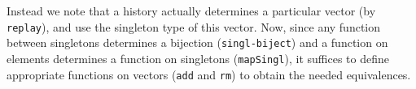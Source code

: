 Instead we note that a history actually determines a particular vector (by \texttt{replay}), and use the singleton
type of this vector. Now, since any function between singletons determines a bijection (\texttt{singl-biject})
and a function on elements determines a function on singletons (\texttt{mapSingl}), it suffices to
define appropriate functions on vectors (\texttt{add} and \texttt{rm}) to obtain the needed equivalences.

\begin{code}%
\>[0]\AgdaSpace{}%
\AgdaSymbol{:}\AgdaSpace{}%
\AgdaSymbol{\{}\AgdaSpace{}%
\AgdaSymbol{:}\AgdaSpace{}%
\AgdaSymbol{\}}\AgdaSpace{}%
\AgdaSpace{}%
\AgdaSpace{}%
\AgdaSpace{}%
\AgdaSpace{}%
\AgdaSpace{}%
\AgdaSpace{}%
\AgdaSpace{}%
\<%
\\
\>[0]\AgdaSpace{}%
\AgdaInductiveConstructor{[]}\AgdaSpace{}%
\AgdaSymbol{=}\AgdaSpace{}%
\AgdaInductiveConstructor{[]}\<%
\\
\>[0]\AgdaSpace{}%
\AgdaSymbol{(}\AgdaSpace{}%
\AgdaSpace{}%
\AgdaSpace{}%
\AgdaSpace{}%
\AgdaOperator{\AgdaInductiveConstructor{::}}\AgdaSpace{}%
\AgdaSymbol{)}\AgdaSpace{}%
\AgdaSymbol{=}\AgdaSpace{}%
\AgdaSpace{}%
\AgdaSpace{}%
\AgdaSpace{}%
\AgdaSymbol{(}\AgdaSpace{}%
\AgdaSymbol{)}\<%
\\
\>[0]\AgdaSpace{}%
\AgdaSymbol{(}\AgdaSpace{}%
\AgdaSpace{}%
\AgdaOperator{\AgdaInductiveConstructor{::}}\AgdaSpace{}%
\AgdaSymbol{)}\AgdaSpace{}%
\AgdaSymbol{=}\AgdaSpace{}%
\AgdaSpace{}%
\AgdaSpace{}%
\AgdaSymbol{(}\AgdaSpace{}%
\AgdaSymbol{)}\<%
\\
%
\\[\AgdaEmptyExtraSkip]%
\>[0]\AgdaSpace{}%
\AgdaSymbol{:}\AgdaSpace{}%
\AgdaSpace{}%
\AgdaSpace{}%
\<%
\\
\>[0]\AgdaSpace{}%
\AgdaSymbol{(}\AgdaSpace{}%
\AgdaSymbol{)}\AgdaSpace{}%
\AgdaSymbol{=}\AgdaSpace{}%

\end{code}

